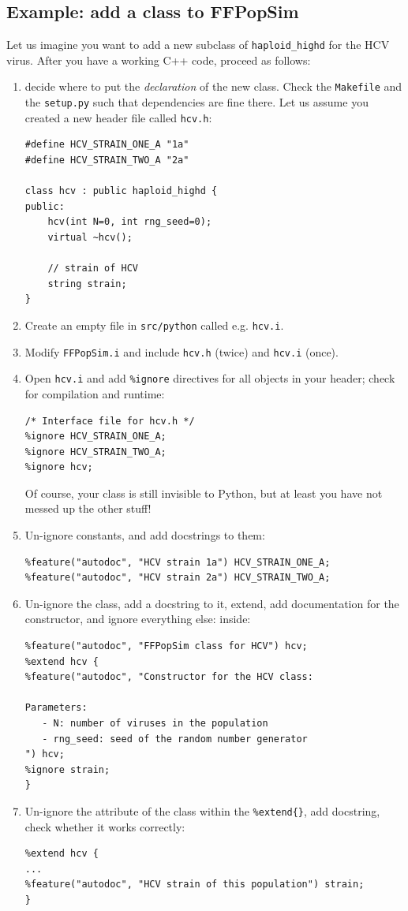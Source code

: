 \documentclass[12pt,a4paper,notitlepage,onecolumn]{article}
\begin{document}
\subsection{Example: add a class to FFPopSim}
Let us imagine you want to add a new subclass of \texttt{haploid\_highd} for the
HCV virus. After you have a working C++ code, proceed as follows:
\begin{enumerate}
\item decide where to put the \textit{declaration} of the new class. Check the
\texttt{Makefile} and the \texttt{setup.py} such that dependencies are fine
there. Let us assume you created a new header file called \texttt{hcv.h}:
\begin{verbatim}
#define HCV_STRAIN_ONE_A "1a"
#define HCV_STRAIN_TWO_A "2a"

class hcv : public haploid_highd {
public:
	hcv(int N=0, int rng_seed=0);
	virtual ~hcv();
	
	// strain of HCV
	string strain;
}
\end{verbatim}
\item Create an empty file in \texttt{src/python} called e.g. \texttt{hcv.i}.
\item Modify \texttt{FFPopSim.i} and include \texttt{hcv.h} (twice) and
\texttt{hcv.i} (once).
\item Open \texttt{hcv.i} and add \texttt{\%ignore} directives for all objects
in your header; check for compilation and runtime:
\begin{verbatim}
/* Interface file for hcv.h */
%ignore HCV_STRAIN_ONE_A;
%ignore HCV_STRAIN_TWO_A;
%ignore hcv;
\end{verbatim}
Of course, your class is
still invisible to Python, but at least you have not messed up the other
stuff!
\item Un-ignore constants, and add docstrings to them:
\begin{verbatim}
%feature("autodoc", "HCV strain 1a") HCV_STRAIN_ONE_A;
%feature("autodoc", "HCV strain 2a") HCV_STRAIN_TWO_A;
\end{verbatim}
\item Un-ignore the class, add a docstring to it, extend, add documentation for
the constructor, and ignore everything else:
inside:
\begin{verbatim}
%feature("autodoc", "FFPopSim class for HCV") hcv;
%extend hcv {
%feature("autodoc", "Constructor for the HCV class:

Parameters:
   - N: number of viruses in the population
   - rng_seed: seed of the random number generator
") hcv;
%ignore strain;
}
\end{verbatim}
\item Un-ignore the attribute of the class within the \texttt{\%extend\{\}}, add docstring,
check whether it works correctly:
\begin{verbatim}
%extend hcv {
...
%feature("autodoc", "HCV strain of this population") strain;
}
\end{verbatim}
\end{enumerate}
\end{document}
